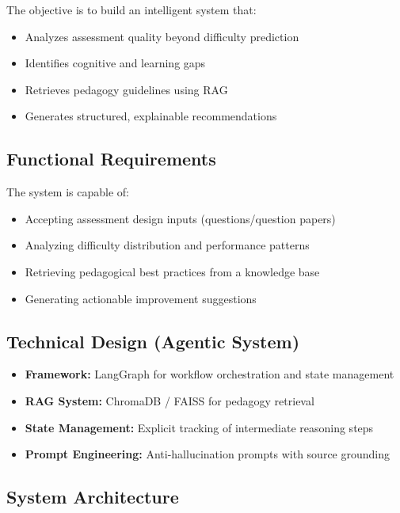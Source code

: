 \documentclass[12pt,a4paper]{article}
\begin{document}
The objective is to build an intelligent system that:
\begin{itemize}[leftmargin=1.5em, itemsep=3pt]
  \item Analyzes assessment quality beyond difficulty prediction
  \item Identifies cognitive and learning gaps
  \item Retrieves pedagogy guidelines using RAG
  \item Generates structured, explainable recommendations
\end{itemize}

\subsection*{Functional Requirements}

The system is capable of:
\begin{itemize}[leftmargin=1.5em, itemsep=3pt]
  \item Accepting assessment design inputs (questions/question papers)
  \item Analyzing difficulty distribution and performance patterns
  \item Retrieving pedagogical best practices from a knowledge base
  \item Generating actionable improvement suggestions
\end{itemize}

\subsection*{Technical Design (Agentic System)}

\begin{itemize}[leftmargin=1.5em, itemsep=4pt]
  \item \textbf{Framework:} LangGraph for workflow orchestration and state management
  \item \textbf{RAG System:} ChromaDB / FAISS for pedagogy retrieval
  \item \textbf{State Management:} Explicit tracking of intermediate reasoning steps
  \item \textbf{Prompt Engineering:} Anti-hallucination prompts with source grounding
\end{itemize}

\subsection*{System Architecture}
\end{document}
